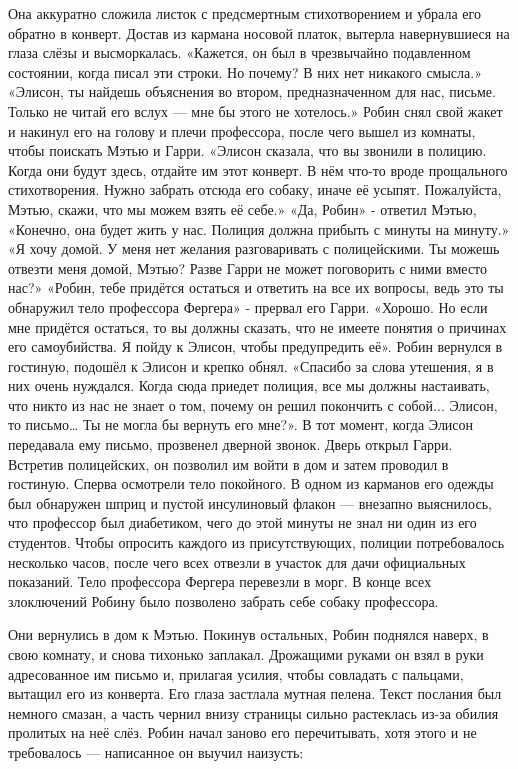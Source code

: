 \documentclass[a4paper,12pt]{book}
\begin{document}
	Она аккуратно сложила листок с предсмертным стихотворением и убрала его обратно в конверт. Достав из кармана носовой платок, вытерла навернувшиеся на глаза слёзы и высморкалась.
	«Кажется, он был в чрезвычайно подавленном состоянии, когда писал эти строки. Но почему? В них нет никакого смысла.»
	«Элисон, ты найдешь объяснения во втором, предназначенном для нас, письме. Только не читай его вслух — мне бы этого не хотелось.»	
	Робин снял свой жакет и накинул его на голову и плечи профессора, после чего вышел из комнаты, чтобы поискать Мэтью и Гарри.
	«Элисон сказала, что вы звонили в полицию. Когда они будут здесь, отдайте им этот конверт. В нём что-то вроде прощального стихотворения. Нужно забрать отсюда его собаку, иначе её усыпят. Пожалуйста, Мэтью, скажи, что мы можем взять её себе.»
	«Да, Робин» - ответил Мэтью,
	«Конечно, она будет жить у нас. Полиция должна прибыть с минуты на минуту.»
	«Я хочу домой. У меня нет желания разговаривать с полицейскими. Ты можешь отвезти меня домой, Мэтью? Разве Гарри не может поговорить с ними вместо нас?»
	«Робин, тебе придётся остаться и ответить на все их вопросы, ведь это ты обнаружил тело профессора Фергера» - прервал его Гарри.
	«Хорошо. Но если мне придётся остаться, то вы должны сказать, что не имеете понятия о причинах его самоубийства. Я пойду к Элисон, чтобы предупредить её».	
	Робин вернулся в гостиную, подошёл к Элисон и крепко обнял.
	«Спасибо за слова утешения, я в них очень нуждался. Когда сюда приедет полиция, все мы должны настаивать, что никто из нас не знает о том, почему он решил покончить с собой... Элисон, то письмо… Ты не могла бы вернуть его мне?».
	В тот момент, когда Элисон передавала ему письмо, прозвенел дверной звонок. Дверь открыл Гарри. Встретив полицейских, он позволил им войти в дом и затем проводил в гостиную.
	Сперва осмотрели тело покойного. В одном из карманов его одежды был обнаружен шприц и пустой инсулиновый флакон — внезапно выяснилось, что профессор был диабетиком, чего до этой минуты не знал ни один из его студентов.
	Чтобы опросить каждого из присутствующих, полиции потребовалось несколько часов, после чего всех отвезли в участок для дачи официальных показаний. Тело профессора Фергера перевезли в морг.
	В конце всех злоключений Робину было позволено забрать себе собаку профессора.

	Они вернулись в дом к Мэтью.
	Покинув остальных, Робин поднялся наверх, в свою комнату, и снова тихонько заплакал. Дрожащими руками он взял в руки адресованное им письмо и, прилагая усилия, чтобы совладать с пальцами, вытащил его из конверта.
	Его глаза застлала мутная пелена. Текст послания был немного смазан, а часть чернил внизу страницы сильно растеклась из-за обилия пролитых на неё слёз. Робин начал заново его перечитывать, хотя этого и не требовалось — написанное он выучил наизусть:
\end{document}
